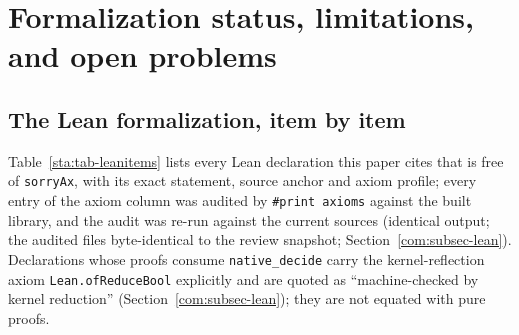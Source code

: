 \section{Formalization status, limitations, and open problems}\label{sec:open}

\subsection{The Lean formalization, item by item}\label{sta:subsec-leanitems}

Table~\ref{sta:tab-leanitems} lists every Lean declaration this paper
cites that is free of \texttt{sorryAx}, with its exact statement, source
anchor and axiom profile; every entry of the axiom column was audited by
\texttt{\#print axioms} against the built library, and the audit was
re-run against the current sources (identical output; the audited files
byte-identical to the review snapshot; Section~\ref{com:subsec-lean}).
Declarations whose proofs consume \texttt{native\_decide} carry the
kernel-reflection axiom \texttt{Lean.ofReduceBool} explicitly and are
quoted as ``machine-checked by kernel reduction''
(Section~\ref{com:subsec-lean}); they are not equated with pure proofs.

